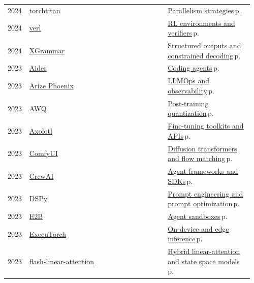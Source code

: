 \documentclass[10pt,a4paper,openany]{report}
\begin{document}
{\begin{longtable}{@{}p{0.07\linewidth}>{\raggedright}p{0.55\linewidth}>{\raggedright\arraybackslash}p{0.34\linewidth}@{}}
2024 & \href{https://github.com/pytorch/torchtitan}{torchtitan} & \hyperref[c:training-0]{Parallelism strategies}\,{\color{muted}\scriptsize p.\,\pageref{c:training-0}}\\
2024 & \href{https://github.com/volcengine/verl}{verl} & \hyperref[c:reasoning-5]{RL environments and verifiers}\,{\color{muted}\scriptsize p.\,\pageref{c:reasoning-5}}\\
2024 & \href{https://github.com/mlc-ai/xgrammar}{XGrammar} & \hyperref[c:context-9]{Structured outputs and constrained decoding}\,{\color{muted}\scriptsize p.\,\pageref{c:context-9}}\\
2023 & \href{https://github.com/Aider-AI/aider}{Aider} & \hyperref[c:coding-0]{Coding agents}\,{\color{muted}\scriptsize p.\,\pageref{c:coding-0}}\\
2023 & \href{https://github.com/Arize-ai/phoenix}{Arize Phoenix} & \hyperref[c:practice-5]{LLMOps and observability}\,{\color{muted}\scriptsize p.\,\pageref{c:practice-5}}\\
2023 & \href{https://github.com/mit-han-lab/llm-awq}{AWQ} & \hyperref[c:quant-3]{Post-training quantization}\,{\color{muted}\scriptsize p.\,\pageref{c:quant-3}}\\
2023 & \href{https://github.com/axolotl-ai-cloud/axolotl}{Axolotl} & \hyperref[c:training-6]{Fine-tuning toolkits and APIs}\,{\color{muted}\scriptsize p.\,\pageref{c:training-6}}\\
2023 & \href{https://github.com/comfyanonymous/ComfyUI}{ComfyUI} & \hyperref[c:embodied-5]{Diffusion transformers and flow matching}\,{\color{muted}\scriptsize p.\,\pageref{c:embodied-5}}\\
2023 & \href{https://github.com/crewAIInc/crewAI}{CrewAI} & \hyperref[c:agents-12]{Agent frameworks and SDKs}\,{\color{muted}\scriptsize p.\,\pageref{c:agents-12}}\\
2023 & \href{https://github.com/stanfordnlp/dspy}{DSPy} & \hyperref[c:practice-3]{Prompt engineering and prompt optimization}\,{\color{muted}\scriptsize p.\,\pageref{c:practice-3}}\\
2023 & \href{https://github.com/e2b-dev/E2B}{E2B} & \hyperref[c:agents-11]{Agent sandboxes}\,{\color{muted}\scriptsize p.\,\pageref{c:agents-11}}\\
2023 & \href{https://github.com/pytorch/executorch}{ExecuTorch} & \hyperref[c:inference-6]{On-device and edge inference}\,{\color{muted}\scriptsize p.\,\pageref{c:inference-6}}\\
2023 & \href{https://github.com/fla-org/flash-linear-attention}{flash-linear-attention} & \hyperref[c:arch-4]{Hybrid linear-attention and state space models}\,{\color{muted}\scriptsize p.\,\pageref{c:arch-4}}\\

\end{longtable}}
\end{document}
